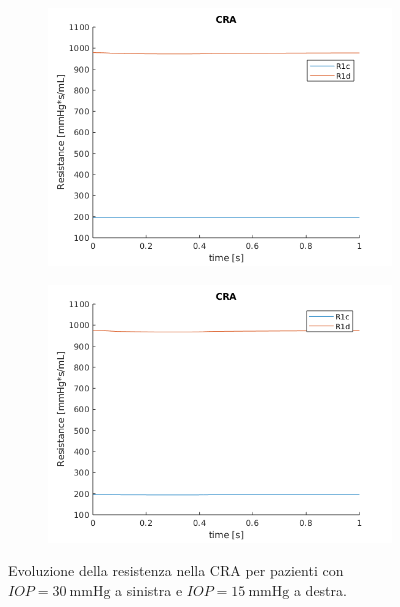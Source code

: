 \documentclass{article}
\begin{document}
\begin{figure}[h]
\begin{subfigure}{.5\textwidth}
  \centering
  \includegraphics[width=1.0\linewidth]{Pictures/IOP30_part1/CRA_30.png}
\end{subfigure}
\begin{subfigure}{.5\textwidth}
  \centering
  \includegraphics[width=1.0\linewidth]{Pictures/IOP15_part1/CRA_15.png}
\end{subfigure}
\caption{Evoluzione della resistenza nella CRA per pazienti con $IOP = \SI{30}{\mmHg}$ a sinistra e $IOP = \SI{15}{\mmHg}$ a destra.}
\label{CRA1530}
\end{figure}
\end{document}
